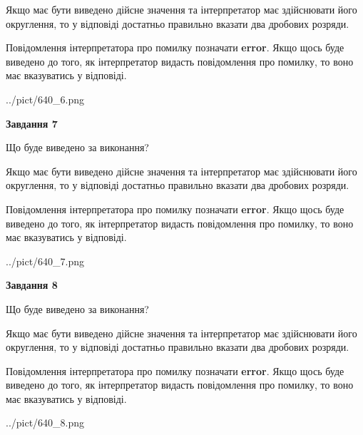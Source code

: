\documentclass[12pt, ukrainian]{article}
\begin{document}
{\begin {Large}
Якщо має бути виведено дійсне значення та інтерпретатор має здійснювати його округлення, 
то у відповіді достатньо правильно вказати два дробових розряди.

Повідомлення інтерпретатора про помилку позначати \textbf{error}.
Якщо щось буде виведено до того, як інтерпретатор видасть повідомлення про помилку, 
то воно має вказуватись у відповіді. \par

\begin{center}
	{../pict/640_6.png}
\end{center}
\newpage

{\begin {center}\textbf{Завдання 7}\end {center}}\par
Що буде виведено за виконання? \par

Якщо має бути виведено дійсне значення та інтерпретатор має здійснювати його округлення, 
то у відповіді достатньо правильно вказати два дробових розряди.

Повідомлення інтерпретатора про помилку позначати \textbf{error}.
Якщо щось буде виведено до того, як інтерпретатор видасть повідомлення про помилку, 
то воно має вказуватись у відповіді. \par

\begin{center}
	{../pict/640_7.png}
\end{center}
\newpage

{\begin {center}\textbf{Завдання 8}\end {center}}\par
Що буде виведено за виконання? \par

Якщо має бути виведено дійсне значення та інтерпретатор має здійснювати його округлення, 
то у відповіді достатньо правильно вказати два дробових розряди.

Повідомлення інтерпретатора про помилку позначати \textbf{error}.
Якщо щось буде виведено до того, як інтерпретатор видасть повідомлення про помилку, 
то воно має вказуватись у відповіді. \par

\begin{center}
	{../pict/640_8.png}
\end{center}
\newpage


\end{Large}}
\end{document}
